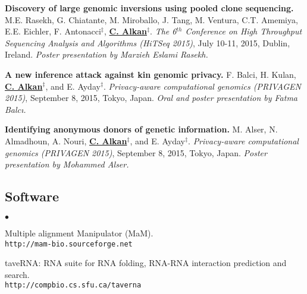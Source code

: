\documentclass[margin,line]{res}
\newenvironment{list2}{
  \begin{list}{$\bullet$}{%
      \setlength{\itemsep}{0in}
      \setlength{\parsep}{0in} \setlength{\parskip}{0in}
      \setlength{\topsep}{0in} \setlength{\partopsep}{0in} 
      \setlength{\leftmargin}{0.2in}}}{\end{list}}
\begin{document}
\begin{resume}
\vspace{-.2cm}
{\bf Discovery of large genomic inversions using pooled clone sequencing.}
M.E. Rasekh, G. Chiatante, M. Miroballo, J. Tang, M. Ventura, C.T. Amemiya, E.E. Eichler, F. Antonacci$^\ddag$, {\bf {\underline{C. Alkan}}}$^\ddag$.
{\em The 6$^{th}$ Conference on High Throughput Sequencing Analysis and Algorithms (HiTSeq 2015)}, 
July 10-11, 2015, Dublin, Ireland. {\it Poster presentation by Marzieh Eslami Rasekh.}

\vspace{-.2cm}
{\bf  A new inference attack against kin genomic privacy.}
F. Balci, H. Kulan, {\bf {\underline{C. Alkan}}}$^\ddag$, and E. Ayday$^\ddag$. 
{\em Privacy-aware computational genomics (PRIVAGEN 2015)}, 
 September 8, 2015, Tokyo, Japan. {\it Oral and poster presentation by Fatma Balcı.}

\vspace{-.2cm}
{\bf Identifying anonymous donors of genetic information.}
M. Alser, N. Almadhoun, A. Nouri, {\bf {\underline{C. Alkan}}}$^\ddag$, and E. Ayday$^\ddag$. 
{\em Privacy-aware computational genomics (PRIVAGEN 2015)}, 
 September 8, 2015, Tokyo, Japan. {\it Poster presentation by Mohammed Alser.}

\vspace*{-.4cm}

\subsection{\small \sc Software}
\begin{list2}
\item
  Multiple alignment Manipulator (MaM).\\
  {\tt http://mam-bio.sourceforge.net}
\item
  taveRNA: RNA suite for RNA folding, RNA-RNA interaction prediction and search.\\
  {\tt http://compbio.cs.sfu.ca/taverna}


\end{list2}
\end{resume}
\end{document}
